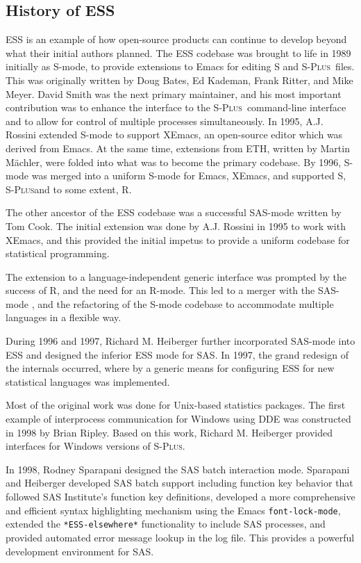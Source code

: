 \documentclass{article}
\newcommand*{\Splus}{\textsc{S-Plus}}
\newcommand{\stexttt}[1]{{\small\texttt{#1}}}
\begin{document}
\subsection{History of ESS}
\label{sec:ESS:history}

ESS is an example of how open-source products can continue to develop
beyond what their initial authors planned.  The ESS codebase was
brought to life in 1989 initially as S-mode, to provide extensions to
Emacs for editing S and \Splus\ files.  This was originally written by
Doug Bates, Ed Kademan, Frank Ritter, and Mike Meyer.  David Smith was
the next primary maintainer, and his most important contribution was
to enhance the interface to the \Splus\ command-line interface and to
allow for control of multiple processes simultaneously.  In 1995, A.J.
Rossini extended S-mode to support XEmacs, an open-source editor which
was derived from Emacs.  At the same time, extensions from ETH,
written by Martin M{\"a}chler, were folded into what was to become the
primary codebase.  By 1996, S-mode was merged into a uniform S-mode
for Emacs, XEmacs, and supported S, \Splus and to some extent, R.

The other ancestor of the ESS codebase was a successful SAS-mode
written by Tom Cook.  The initial extension was done by A.J. Rossini
in 1995 to work with XEmacs, and this provided the initial impetus to
provide a uniform codebase for statistical programming.

The extension to a language-independent generic interface was prompted
by the success of R, and the need for an R-mode.  This led to a merger
with the SAS-mode \cite{SASMODE}, and the refactoring of the S-mode
codebase to accommodate multiple languages in a flexible way.

During 1996 and 1997, Richard M. Heiberger further incorporated
SAS-mode into ESS and designed the inferior ESS mode for SAS.  In
1997, the grand redesign of the internals occurred, where by a generic
means for configuring ESS for new statistical languages was
implemented. 

Most of the original work was done for Unix-based statistics packages.
The first example of interprocess communication for Windows using DDE
was constructed in 1998 by Brian Ripley.  Based on this work, Richard
M. Heiberger provided interfaces for Windows versions of \Splus.

In 1998, Rodney Sparapani designed the SAS batch interaction mode.
Sparapani and Heiberger developed SAS batch support including function
key behavior that followed SAS Institute's function key definitions,
developed a more comprehensive and efficient syntax highlighting
mechanism using the Emacs \stexttt{font-lock-mode}, extended the
\stexttt{*ESS-elsewhere*} functionality to include SAS processes, and
provided automated error message lookup in the log file.  This
provides a powerful development environment for SAS.
\end{document}

